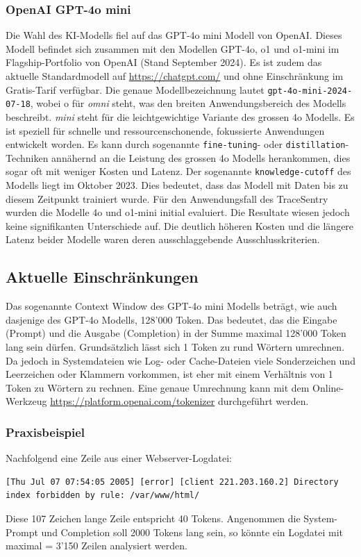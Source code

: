 \documentclass[a4paper,12pt]{report}
\begin{document}
    \subsubsection{OpenAI GPT-4o mini}\label{subsubsec:openai-gpt-4o}
    Die Wahl des KI-Modells fiel auf das GPT-4o mini Modell von OpenAI.
    Dieses Modell befindet sich zusammen mit den Modellen GPT-4o, o1 und o1-mini im Flagship-Portfolio von OpenAI (Stand September 2024).
    Es ist zudem das aktuelle Standardmodell auf \url{https://chatgpt.com/} und ohne Einschränkung im Gratis-Tarif verfügbar.
    Die genaue Modellbezeichnung lautet \texttt{gpt-4o-mini-2024-07-18}, wobei o für \textit{omni} steht, was den breiten Anwendungsbereich des Modells beschreibt.
    \textit{mini} steht für die leichtgewichtige Variante des grossen 4o Modells.
    Es ist speziell für schnelle und ressourcenschonende, fokussierte Anwendungen entwickelt worden.
    Es kann durch sogenannte \texttt{fine-tuning}- oder \texttt{distillation}-Techniken annähernd an die Leistung des grossen 4o Modells herankommen, dies sogar oft mit weniger Kosten und Latenz.
    Der sogenannte \texttt{knowledge-cutoff} des Modells liegt im Oktober 2023.
    Dies bedeutet, dass das Modell mit Daten bis zu diesem Zeitpunkt trainiert wurde.
    Für den Anwendungsfall des TraceSentry wurden die Modelle 4o und o1-mini initial evaluiert.
    Die Resultate wiesen jedoch keine signifikanten Unterschiede auf.
    Die deutlich höheren Kosten und die längere Latenz beider Modelle waren deren ausschlaggebende Ausschlusskriterien.

    \subsection{Aktuelle Einschränkungen}\label{subsec:technische-einschrankungen}
    Das sogenannte Context Window des GPT-4o mini Modells beträgt, wie auch dasjenige des GPT-4o Modells, 128'000 Token.
    Das bedeutet, das die Eingabe (Prompt) und die Ausgabe (Completion) in der Summe maximal 128'000 Token lang sein dürfen.
    Grundsätzlich lässt sich 1 Token zu rund  Wörtern umrechnen.
    Da jedoch in Systemdateien wie Log- oder Cache-Dateien viele Sonderzeichen und Leerzeichen oder Klammern vorkommen, ist eher mit einem Verhältnis von 1 Token zu  Wörtern zu rechnen.
    Eine genaue Umrechnung kann mit dem Online-Werkzeug \url{https://platform.openai.com/tokenizer} durchgeführt werden.

    \subsubsection{Praxisbeispiel}\label{subsubsec:praxisbeispiel}
    Nachfolgend eine Zeile aus einer Webserver-Logdatei:
    \begin{verbatim}[Thu Jul 07 07:54:05 2005] [error] [client 221.203.160.2] Directory
index forbidden by rule: /var/www/html/
    \end{verbatim}
    Diese 107 Zeichen lange Zeile entspricht 40 Tokens.
    Angenommen die System-Prompt und Completion soll 2000 Tokens lang sein, so könnte ein Logdatei mit maximal  = 3'150 Zeilen analysiert werden.
\end{document}

